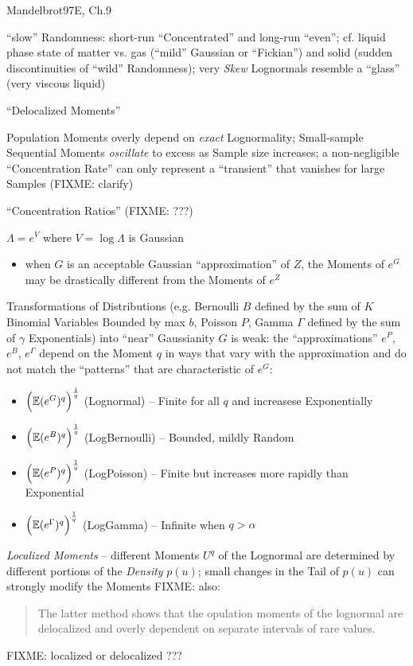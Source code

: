 Mandelbrot97E, Ch.9

``slow'' Randomness: short-run ``Concentrated'' and long-run ``even''; cf.
liquid phase state of matter vs. gas (``mild'' Gaussian or ``Fickian'') and
solid (sudden discontinuities of ``wild'' Randomness);
very \emph{Skew} Lognormals resemble a ``glass'' (very viscous liquid)

``Delocalized Moments''

Population Moments overly depend on \emph{exact} Lognormality; Small-sample
Sequential Moments \emph{oscillate} to excess as Sample size increases; a
non-negligible ``Concentration Rate'' can only represent a ``transient'' that
vanishes for large Samples (FIXME: clarify)

``Concentration Ratios'' (FIXME: ???)

$\Lambda = e^V$ where $V = \log \Lambda$ is Gaussian

\begin{itemize}
  \item when $G$ is an acceptable Gaussian ``approximation'' of $Z$, the Moments
    of $e^G$ may be drastically different from the Moments of $e^Z$
\end{itemize}

Transformations of Distributions (e.g. Bernoulli $B$ defined by the sum of $K$
Binomial Variables Bounded by max $b$, Poisson $P$, Gamma $\Gamma$ defined by
the sum of $\gamma$ Exponentials) into ``near'' Gaussianity $G$ is weak: the
``approximations'' $e^P$, $e^B$, $e^\Gamma$ depend on the Moment $q$ in ways
that vary with the approximation and do not match the ``patterns'' that are
characteristic of $e^G$:
\begin{itemize}
  \item $\Big(\mathbb{E}(e^G)^q\Big)^\frac{1}{q}$ (Lognormal) -- Finite for all $q$
    and increasese Exponentially
  \item $\Big(\mathbb{E}(e^B)^q\Big)^\frac{1}{q}$ (LogBernoulli) -- Bounded, mildly
    Random
  \item $\Big(\mathbb{E}(e^P)^q\Big)^\frac{1}{q}$ (LogPoisson) -- Finite but
    increases more rapidly than Exponential
  \item $\Big(\mathbb{E}(e^\Gamma)^q\Big)^\frac{1}{q}$ (LogGamma) -- Infinite when
    $q > \alpha$
\end{itemize}

\emph{Localized Moments} -- different Moments $U^q$ of the Lognormal are
determined by different portions of the \emph{Density} $p(u)$; small changes in
the Tail of $p(u)$ can strongly modify the Moments
FIXME: also:
\begin{quote}
  The latter method shows that the opulation moments of the lognormal are
  delocalized and overly dependent on separate intervals of rare values.
\end{quote}
FIXME: localized or delocalized ???

